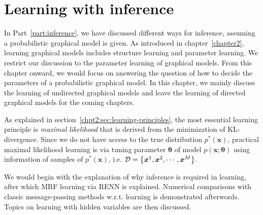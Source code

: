 \chapter{Learning with inference}
In Part~\ref{part:inference}, we have discussed different ways for inference, assuming a probabilistic graphical model is given. As introduced in chapter~\ref{chapter2}, learning graphical models includes structure learning and parameter learning. We restrict our discussion to the parameter learning of graphical models. From this chapter onward, we would focus on answering the question of how to decide the parameters of a probabilistic graphical model.
In this chapter, we mainly discuss the learning of undirected graphical models and leave the learning of directed graphical models for the coming chapters.

As explained in section~\ref{chpt2:sec:learning-principles}, the most essential learning principle is \textit{maximal likelihood} that is derived from the minimization of KL-divergence. Since we do not have access to the true distribution $p^{\ast}(\bm{x})$, practical maximal likelihood learning is via tuning parameter $\bm{\theta}$ of model $p(\bm{x};\bm{\theta})$ using information of samples of $p^{\ast}(\bm{x})$, i.e. $\mathcal{D} = \left\{ \bm{x}^1, \bm{x}^2, \cdots, \bm{x}^{M}\right\}$.

We would begin with the explanation of why inference is required in learning, after which MRF learning via RENN is explained. Numerical comparisons with classic message-passing methods w.r.t. learning is demonstrated afterwords. Topics on learning with hidden variables are then discussed.

